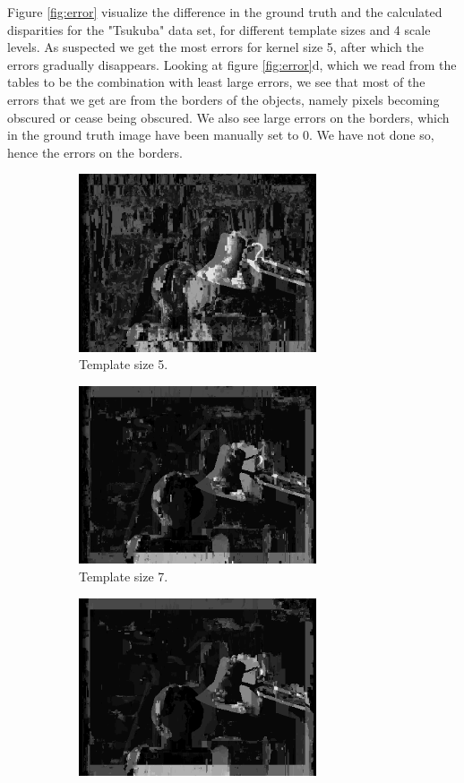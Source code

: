 \documentclass[12pt,a4paper,oneside,final]{article}
\begin{document}
Figure \ref{fig:error} visualize the difference in the ground truth and the calculated disparities for the "Tsukuba" data set, for different template sizes and 4 scale levels. As suspected we get the most errors for kernel size 5, after which the errors gradually disappears. Looking at figure \ref{fig:error}d, which we read from the tables to be the combination with least large errors, we see that most of the errors that we get are from the borders of the objects, namely pixels becoming obscured or cease being obscured. We also see large errors on the borders, which in the ground truth image have been manually set to 0. We have not done so, hence the errors on the borders.

\begin{figure}[H]
	\centering
	\begin{subfigure}[b]{0.5\textwidth}
		\centering
		\includegraphics[width=7cm]{err_s4_k5set_1.png}
		\caption{Template size 5.}
	\end{subfigure}%
	\begin{subfigure}[b]{0.5\textwidth}
		\centering
		\includegraphics[width=7cm]{err_s4_k7set_1.png}
		\caption{Template size 7.}
	\end{subfigure}
	\begin{subfigure}[b]{0.5\textwidth}
		\centering
		\includegraphics[width=7cm]{err_s4_k9set_1.png}

\end{subfigure}
\end{figure}
\end{document}
